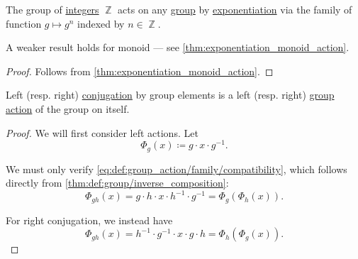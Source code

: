 \begin{proposition}\label{thm:exponentiation_group_action}
  The group of \hyperref[def:integers]{integers} \( \BbbZ \) acts on any \hyperref[def:group]{group} by \hyperref[def:monoid/exponentiation]{exponentiation} via the family of function \( g \mapsto g^n \) indexed by \( n \in \BbbZ \).
\end{proposition}
\begin{comments}
  \item A weaker result holds for monoid --- see \cref{thm:exponentiation_monoid_action}.
\end{comments}
\begin{proof}
  Follows from \cref{thm:exponentiation_monoid_action}.
\end{proof}

\begin{proposition}\label{thm:group_conjugation_action}
  Left (resp. right) \hyperref[def:group_conjugation]{conjugation} by group elements is a left (resp. right) \hyperref[def:group_action]{group action} of the group on itself.
\end{proposition}
\begin{proof}
  We will first consider left actions. Let
  \begin{equation*}
    \Phi_g(x) \coloneqq g \cdot x \cdot g^{-1}.
  \end{equation*}

  We must only verify \eqref{eq:def:group_action/family/compatibility}, which follows directly from \cref{thm:def:group/inverse_composition}:
  \begin{equation*}
    \Phi_{gh}(x)
    =
    g \cdot h \cdot x \cdot h^{-1} \cdot g^{-1}
    =
    \Phi_g(\Phi_h(x)).
  \end{equation*}

  For right conjugation, we instead have
  \begin{equation*}
    \Phi_{gh}(x)
    =
    h^{-1} \cdot g^{-1} \cdot x \cdot g \cdot h
    =
    \Phi_h(\Phi_g(x)).
  \end{equation*}
\end{proof}

